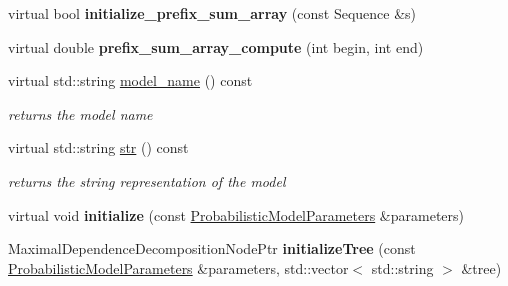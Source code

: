 \begin{DoxyCompactItemize}
\mbox{\label{classtops_1_1MaximalDependenceDecomposition_afb035c66db350b10b6c621a7dac7fa4f}} 
virtual bool {\bfseries initialize\+\_\+prefix\+\_\+sum\+\_\+array} (const Sequence \&s)
\item 
\mbox{\label{classtops_1_1MaximalDependenceDecomposition_aa99aeefe2b40c9f4c55a3d646000b4d6}} 
virtual double {\bfseries prefix\+\_\+sum\+\_\+array\+\_\+compute} (int begin, int end)
\item 
\mbox{\label{classtops_1_1MaximalDependenceDecomposition_a62ef59c66231018c6fed2428a54db1e7}} 
virtual std\+::string \hyperlink{classtops_1_1MaximalDependenceDecomposition_a62ef59c66231018c6fed2428a54db1e7}{model\+\_\+name} () const
\begin{DoxyCompactList}\small\item\em returns the model name \end{DoxyCompactList}\item 
\mbox{\label{classtops_1_1MaximalDependenceDecomposition_a31ea645c77342665893b8a5607545bce}} 
virtual std\+::string \hyperlink{classtops_1_1MaximalDependenceDecomposition_a31ea645c77342665893b8a5607545bce}{str} () const
\begin{DoxyCompactList}\small\item\em returns the string representation of the model \end{DoxyCompactList}\item 
\mbox{\label{classtops_1_1MaximalDependenceDecomposition_a8eaa2eb26dbf4d3e0aacb52ccfc1b5de}} 
virtual void {\bfseries initialize} (const \hyperlink{classtops_1_1ProbabilisticModelParameters}{Probabilistic\+Model\+Parameters} \&parameters)
\item 
\mbox{\label{classtops_1_1MaximalDependenceDecomposition_a0c0383e58e339315dc5811f9f266fd08}} 
Maximal\+Dependence\+Decomposition\+Node\+Ptr {\bfseries initialize\+Tree} (const \hyperlink{classtops_1_1ProbabilisticModelParameters}{Probabilistic\+Model\+Parameters} \&parameters, std\+::vector$<$ std\+::string $>$ \&tree)
\end{DoxyCompactItemize}


